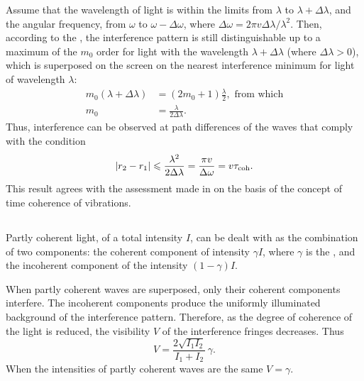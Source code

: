 Assume that the wavelength of light is within the limits from $\lambda$ to $\lambda + \Delta \lambda$, and the angular frequency, from $\omega$ to $\omega - \Delta \omega$,
where $\Delta \omega = 2 \pi v \Delta \lambda/ \lambda^{2}$. Then, according to the , the interference pattern is still distinguishable up to a maximum of the $m_{0}$ order for light with the wavelength $\lambda + \Delta \lambda$ (where $\Delta \lambda > 0$), which is superposed on the screen on the nearest interference minimum for light of wavelength $\lambda$:
\begin{align*}%
m_{0} (\lambda + \Delta \lambda) & = (2m_{0} +1) \frac{\lambda}{2}, \text{ from which}\\
m_{0} & = \frac{\lambda}{2 \Delta \lambda}.
\end{align*}
Thus, interference can be observed at path differences of the
waves that comply with the condition
\begin{equation*}%
\abs{r_{2} - r_{1}} \leqslant \frac{\lambda^{2}}{2\Delta  \lambda} =\frac{\pi v}{\Delta \omega} = v \tau_{\text{coh}}.
\end{equation*}
This result agrees with the assessment made in  on the basis of the concept of time coherence of vibrations.

\subsection{}\label{32.2.6} Partly coherent light, of a total intensity $I$, can be dealt with as the combination of two components: the coherent component of intensity $\gamma I$, where $\gamma$ is the , and the incoherent component of the intensity $(1-\gamma)I$.

When partly coherent waves are superposed, only their coherent
components interfere. The incoherent components produce the
uniformly illuminated background of the interference pattern.
Therefore, as the degree of coherence of the light is reduced, the visibility $V$ of the interference fringes decreases. Thus
\begin{equation*}%
V = \frac{2 \sqrt{I_{1}I_{2}}}{I_{1}+ I_{2}} \, \gamma.
\end{equation*}
When the intensities of partly coherent waves are the same
$V = \gamma$.

